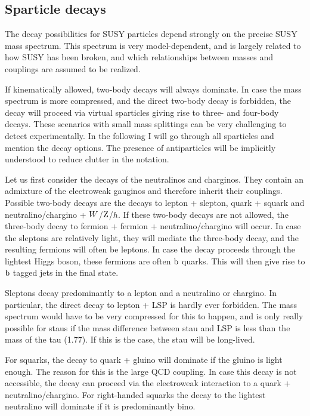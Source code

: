 \subsection{Sparticle decays}

The decay possibilities for SUSY particles depend strongly on the precise SUSY mass spectrum. 
This spectrum is very model-dependent, and is largely related to how SUSY has been broken, and
which relationships between masses and couplings are assumed to be realized. 

If kinematically allowed, two-body decays will always dominate. In case the mass spectrum is more
compressed, and the direct two-body decay is forbidden, the decay will proceed via virtual
sparticles giving rise to three- and four-body decays. These scenarios with small mass splittings
can be very challenging to detect experimentally. In the following I will go through all sparticles
and mention the decay options. The presence of antiparticles will be implicitly understood to
reduce clutter in the notation. 

Let us first consider the decays of the neutralinos and charginos. They contain an admixture of the
electroweak gauginos and therefore inherit their couplings. Possible two-body decays are the decays
to lepton + slepton, quark + squark and neutralino/chargino + $W$/$\mathrm{Z}$/$h$. If these two-body
decays are not allowed, the three-body decay to fermion + fermion + neutralino/chargino will
occur. In case the sleptons are relatively light, they will mediate the three-body decay, and the
resulting fermions will often be leptons. In case the decay proceeds through the lightest Higgs
boson, these fermions are often $\mathrm{b}$ quarks. This will then give rise to $\mathrm{b}$ tagged jets in
the final state. 

Sleptons decay predominantly to a lepton and a neutralino or chargino. 
In particular, the direct decay to lepton + LSP is hardly ever forbidden. 
The mass spectrum would have to be very compressed for this to happen, and is only really
possible for staus if the mass difference between stau and LSP is less than the mass
of the tau (1.77\GeV). If this is the case, the stau will be long-lived. 

For squarks, the decay to quark + gluino will dominate if the gluino is light enough. The reason
for this is the large QCD coupling. 
In case this decay is not accessible, the decay can proceed via the electroweak interaction to a
quark + neutralino/chargino. For right-handed squarks the decay to the lightest neutralino will
 dominate if it is predominantly bino. 

